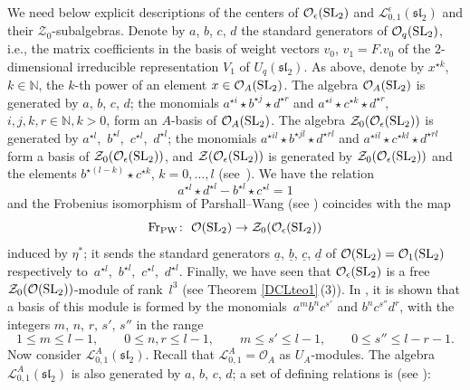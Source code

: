 \documentclass[10pt,a4paper]{amsart}
\numberwithin{equation}{section}
\theoremstyle{definition}
\newcommand{\e}{\epsilon}
\newcommand{\mn}{\mathbb{N}}
\newcommand{\Ll}{{\mathcal L}}
\newcommand{\Oo}{{\mathcal O}}
\newcommand{\ra}{\rightarrow}
\begin{document}
We need below explicit descriptions of the centers of $\Oo_\e({\rm SL}_2)$ and $\Ll_{0,1}^\e({\mathfrak{sl}_2})$ and their $\mathcal{Z}_0$-subalgebras. Denote by $a$, $b$, $c$, $d$ the standard generators of $\mathcal{O}_q({\rm SL}_2)$, i.e., the matrix coefficients in the basis of weight vectors $v_0$, $v_1=F.v_0$ of the $2$-dimensional irreducible representation $V_1$ of $U_q({\mathfrak{sl}_2})$. As above, denote by $x^{\star k}$, $k\in \mathbb{N}$, the $k$-th power of an element $x\in \Oo_A({\rm SL}_2)$. The algebra $\mathcal{O}_A({\rm SL}_2)$ is generated by $a$, $b$, $c$, $d$; the monomials $a^{\star i } \star b^{\star j } \star d^{\star r }$ and $a^{\star i } \star c^{\star k } \star d^{\star r }$, $i,j,k,r\in \mn, k>0$, form an $A$-basis of $\mathcal{O}_A({\rm SL}_2)$. The algebra $\mathcal{Z}_0(\Oo_\e({\rm SL}_2))$ is generated by $a^{\star l}$,~$b^{\star l}$,~$c^{\star l}$,~$d^{\star l}$; the monomials $a^{\star i l} \star b^{\star j l} \star d^{\star r l}$ and $a^{\star i l} \star c^{\star k l} \star d^{\star r l}$ form a basis of $\mathcal{Z}_0(\Oo_\e({\rm SL}_2))$, and $\mathcal{Z}(\Oo_\e({\rm SL}_2))$ is generated by $\mathcal{Z}_0(\Oo_\e({\rm SL}_2))$ and the elements $b^{\star (l-k)}\star c^{\star k}$, $k=0,\dots,l$ (see~\cite[Proposition~1.4 and the appendix]{DC-L}). We have the relation
\begin{equation}\label{PWrel} a^{\star l}\star d^{\star l}-b^{\star l}\star c^{\star l} =1
\end{equation}
and the Frobenius isomorphism of Parshall--Wang (see \cite[Chapter~7]{PW}) coincides with the map
\[{\rm Fr}_{\rm PW}\colon\ \Oo({\rm SL}_2) \ra \mathcal{Z}_0(\Oo_\e({\rm SL}_2))\]
induced by $\eta^*$; it sends the standard generators $\underline{a}$, $\underline{b}$, $\underline{c}$, $\underline{d}$ of $\Oo({\rm SL}_2) = \mathcal{O}_1({\rm SL}_2)$ respectively to~$a^{\star l}$,~$b^{\star l}$,~$c^{\star l}$,~$d^{\star l}$. Finally, we have seen that $\Oo_\e({\rm SL}_2)$ is a free $\mathcal{Z}_0(\Oo({\rm SL}_2))$-module of rank~$l^3$ (see Theorem \ref{DCLteo1}\,(3)). In \cite{DRZ}, it is shown that a basis of this module is formed by the monomials~$a^mb^nc^{s'}$ and $b^nc^{s''}d^r$, with the integers $m$, $n$, $r$, $s'$, $s''$ in the range
\begin{equation}\label{basisSL2}
1\leq m \leq l-1,\qquad 0 \leq n,r \leq l-1,\qquad m \leq s' \leq l-1,\qquad 0 \leq s'' \leq l-r-1.
\end{equation}
Now consider $\Ll_{0,1}^A({\mathfrak{sl}_2})$. Recall that $\Ll_{0,1}^A=\Oo_A$ as $U_A$-modules. The algebra $\Ll_{0,1}^A({\mathfrak{sl}_2})$ is also generated by $a$, $b$, $c$, $d$; a set of defining relations is (see \cite[Section 5]{BR}):
\end{document}
